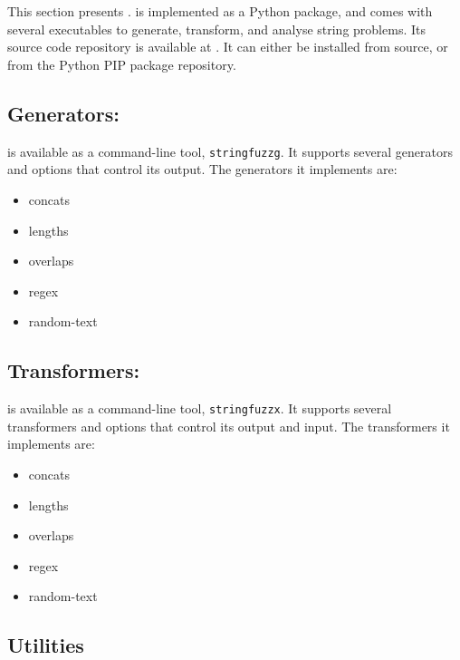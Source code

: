 \section{\fuzzer{}}

    This section presents \fuzzer{}. \fuzzer{} is implemented as a Python package, and comes with several executables to generate, transform, and analyse \smt{} string problems. Its source code repository is available at \sourceRepo{}. It can either be installed from source, or from the Python PIP package repository.

    \subsection{Generators: \generator{}}

        \generator{} is available as a command-line tool, \texttt{stringfuzzg}. It supports several generators and options that control its output. The generators it implements are:

        \begin{itemize}
            \item concats
            \item lengths
            \item overlaps
            \item regex
            \item random-text
        \end{itemize}

    \subsection{Transformers: \transformer{}}

        \transformer is available as a command-line tool, \texttt{stringfuzzx}. It supports several transformers and options that control its output and input. The transformers it implements are:

        \begin{itemize}
            \item concats
            \item lengths
            \item overlaps
            \item regex
            \item random-text
        \end{itemize}

    \subsection{Utilities}

